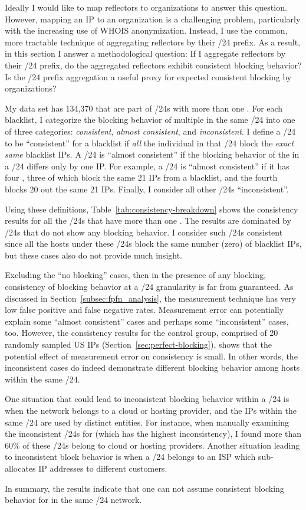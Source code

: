 Ideally I would like to map reflectors to organizations to answer
this question.  However, mapping an IP to an organization is a
challenging problem, particularly with the increasing use of WHOIS
anonymization.  Instead, I use the common, more tractable technique
of aggregating reflectors by their /24 prefix.  As a result, in this
section I answer a methodological question: If I aggregate
reflectors by their /24 prefix, do the aggregated reflectors exhibit
consistent blocking behavior?  Is the /24 prefix aggregation a useful
proxy for expected consistent blocking by organizations?

My data set has 134,370 {} that are part of /24s with more
than one {}.  For each blacklist, I categorize the blocking
behavior of multiple {} in the same /24 into one of three
categories: \textit{consistent}, \textit{almost consistent}, and
\textit{inconsistent}.  I define a /24 to be ``consistent'' for a
blacklist if \textit{all} the individual {} in that /24
block the \textit{exact same} blacklist IPs.
%
A /24 is ``almost consistent'' if the blocking behavior of the
{} in a /24 differs only by one IP. For example, a /24 is
``almost consistent'' if it has four {}, three of which
block the same 21 IPs from a blacklist, and the fourth {}
blocks 20 out the same 21 IPs.
Finally, I consider all other /24s ``inconsistent''.


Using these definitions, Table~\ref{tab:consistency-breakdown} shows
the consistency results for all the /24s that have more than one
{}. The results are dominated by /24s that do not show any
blocking behavior.  I consider such /24s consistent since all the
hosts under these /24s block the same number (zero) of blacklist IPs,
but these cases also do not provide much insight.

Excluding the ``no blocking'' cases, then in the presence of any
blocking, consistency of blocking behavior at a /24 granularity is far
from guaranteed.  As discussed in Section~\ref{subsec:fpfn_analysis},
the measurement technique has very low false positive and false
negative rates.  Measurement error can potentially explain some
``almost consistent'' cases and perhaps some ``inconsistent'' cases,
too.  However, the consistency results for the control group,
comprised of 20 randomly sampled US IPs
(Section~\ref{sec:perfect-blocking}), shows that the potential effect
of measurement error on consistency is small.  In other words, the
inconsistent cases do indeed demonstrate different blocking behavior
among hosts within the same /24.

One situation that could lead to inconsistent blocking behavior within
a /24 is when the network belongs to a cloud or hosting provider, and
the IPs within the same /24 are used by distinct entities.  For
instance, when manually examining the inconsistent /24s for {\bdsatif}
(which has the highest inconsistency), I found more than 60\% of
these /24s belong to cloud or hosting providers.  Another situation
leading to inconsistent block behavior is when a /24 belongs to an ISP
which sub-allocates IP addresses to different customers.

In summary, the results indicate that one can not assume consistent
blocking behavior for {} in the same /24 network.
